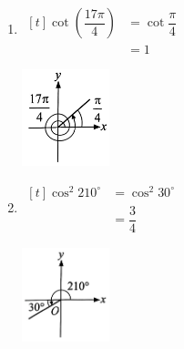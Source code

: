 \documentclass{report}
\begin{document}
\begin{question}
\begin{enumerate}[label=(\alph*),leftmargin=*]
\begin{multicols}{2}
\begin{center}
                \end{center}
            \end{multicols}
            \vspace{-3.2em}
            \item \begin{multicols}{2}
                $\begin{aligned}[t]
                    \cot\left(\dfrac{17\pi}{4}\right) &= \cot\dfrac{\pi}{4} \\
                    &= 1
                \end{aligned}$
                \vfill\null
                \begin{center}
                    \includegraphics[width=0.2\textwidth]{assets/9-15.jpg}
                \end{center}
            \end{multicols}
            \vspace{-3.2em}
            \item \begin{multicols}{2}
                $\begin{aligned}[t]
                    \cos^2 210^\circ &= \cos^2 30^\circ \\
                    &= \dfrac{3}{4}
                \end{aligned}$
                \vfill\null
                \begin{center}
                    \includegraphics[width=0.2\textwidth]{assets/9-16.jpg}
                \end{center}
            \end{multicols}
        \end{enumerate}
\end{question}
\end{document}
